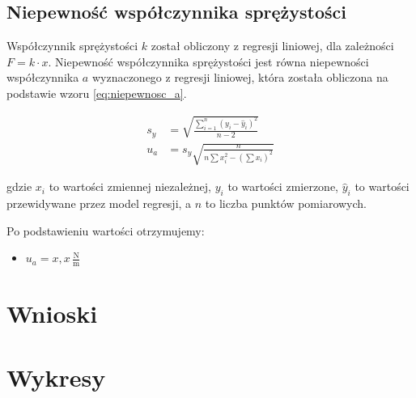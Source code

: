 \documentclass[a4paper,12pt]{article}
\begin{document}
\subsection{Niepewność współczynnika sprężystości}

Współczynnik sprężystości $k$ został obliczony z regresji liniowej, dla zależności $F = k \cdot x$. Niepewność współczynnika sprężystości jest równa niepewności współczynnika $a$ wyznaczonego z regresji liniowej, która została obliczona na podstawie wzoru \ref{eq:niepewnosc_a}.


\begin{align*}
    s_y & = \sqrt{\frac{\sum_{i=1}^{n} (y_i - \hat{y}_i)^2}{n-2}}         \\
    u_a & = s_y \sqrt{\frac{n}{n \sum x_i^2 - \left( \sum x_i \right)^2}}
    \label{eq:niepewnosc_a}
\end{align*}

gdzie $x_i$ to wartości zmiennej niezależnej, $y_i$ to wartości zmierzone, $\hat{y}_i$ to wartości przewidywane przez model regresji, a $n$ to liczba punktów pomiarowych.

Po podstawieniu wartości otrzymujemy:

\begin{itemize}
    \item $u_a = x{,}x\,\frac{\text{N}}{\text{m}}$
\end{itemize}

\section{Wnioski}

\section{Wykresy}



\end{document}
